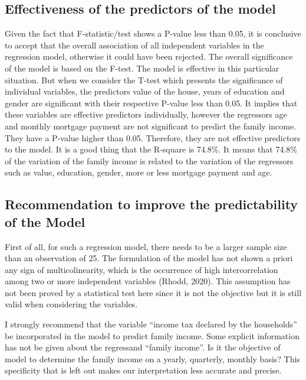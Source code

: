 \documentclass[
]{article}
\begin{document}
\hypertarget{effectiveness-of-the-predictors-of-the-model}{%
\subsection{Effectiveness of the predictors of the
model}\label{effectiveness-of-the-predictors-of-the-model}}

Given the fact that F-statistic/test shows a P-value less than 0.05, it
is conclusive to accept that the overall association of all independent
variables in the regression model, otherwise it could have been
rejected. The overall significance of the model is based on the F-test.
The model is effective in this particular situation. But when we
consider the T-test which presents the significance of individual
variables, the predictors value of the house, years of education and
gender are significant with their respective P-value less than 0.05. It
implies that these variables are effective predictors individually,
however the regressors age and monthly mortgage payment are not
significant to predict the family income. They have a P-value higher
than 0.05. Therefore, they are not effective predictors to the model. It
is a good thing that the R-square is 74.8\%. It means that 74.8\% of the
variation of the family income is related to the variation of the
regressors such as value, education, gender, more or less mortgage
payment and age.

\hypertarget{recommendation-to-improve-the-predictability-of-the-model}{%
\subsection{Recommendation to improve the predictability of the
Model}\label{recommendation-to-improve-the-predictability-of-the-model}}

First of all, for such a regression model, there needs to be a larger
sample size than an observation of 25. The formulation of the model has
not shown a priori any sign of multicolinearity, which is the occurrence
of high intercorrelation among two or more independent variables (Rhodd,
2020). This assumption has not been proved by a statistical test here
since it is not the objective but it is still valid when considering the
variables.

I strongly recommend that the variable ``income tax declared by the
households'' be incorporated in the model to predict family income. Some
explicit information has not be given about the regressand ``family
income''. Is it the objective of model to determine the family income on
a yearly, quarterly, monthly basis? This specificity that is left out
makes our interpretation less accurate and precise.
\end{document}
